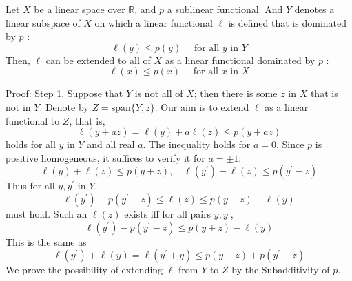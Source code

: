 \documentclass[12pt, oneside]{book}
\begin{document}
\begin{theorem}
    Let $X$ be a linear space over $\mathbb{R}$, and $p$ a sublinear functional.
    And $Y$ denotes a linear subspace of $X$ on which a linear functional $\ell$ is defined that is dominated by $p$ :
    \begin{equation*}
        \ell(y) \leq p(y) \quad \text { for all } y \text { in } Y
    \end{equation*}
    Then, $\ell$ can be extended to all of $X$ as a linear functional dominated by $p$ :
    \begin{equation*}
        \ell(x) \leq p(x) \quad \text { for all } x \text { in } X
    \end{equation*}

    Proof:
    Step 1.
    Suppose that $Y$ is not all of $X$; then there is some $z$ in $X$ that is not in $Y$. Denote by $Z=\mathrm{span}\{Y,z\}$. Our aim is to extend $\ell$ as a linear functional to $Z$, that is,
    \begin{equation*}
        \ell(y+a z)=\ell(y)+a \ell(z) \leq p(y+a z)
    \end{equation*}
    holds for all $y$ in $Y$ and all real $a$. The inequality holds for $a = 0$. Since $p$ is positive homogeneous, it suffices to verify it for $a= \pm 1$:
    \begin{equation*}
        \ell(y)+\ell(z) \leq p(y+z), \quad \ell\left(y^{\prime}\right)-\ell(z) \leq p\left(y^{\prime}-z\right)
    \end{equation*}
    Thus for all $y, y^{\prime}$ in $Y$,
    \begin{equation*}
        \ell\left(y^{\prime}\right)-p\left(y^{\prime}-z\right) \leq \ell(z) \leq p(y+z)-\ell(y)
    \end{equation*}
    must hold. Such an $\ell(z)$ exists iff for all pairs $y, y^{\prime}$,
    \begin{equation*}
        \ell\left(y^{\prime}\right)-p\left(y^{\prime}-z\right) \leq p(y+z)-\ell(y)
    \end{equation*}
    This is the same as
    \begin{equation*}
        \ell\left(y^{\prime}\right)+\ell(y)=\ell\left(y^{\prime}+y\right) \leq p(y+z)+p\left(y^{\prime}-z\right)
    \end{equation*}
    We prove the possibility of extending $\ell$ from $Y$ to $Z$ by the Subadditivity of $p$.


\end{theorem}
\end{document}
